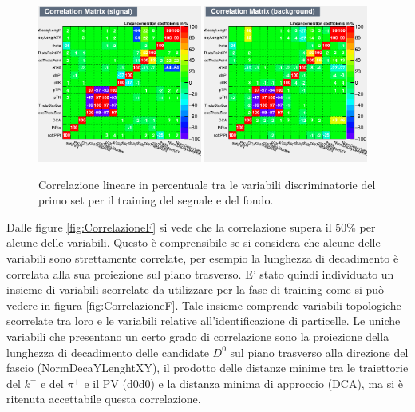    
    \begin{figure}
       \centering
       \includegraphics[width=0.48\textwidth]{training&testing/CorrelationMatrixSin.png}
        \includegraphics[width=0.48\textwidth]{training&testing/CorrelationMatrixBin.png}
       \caption{Correlazione lineare in percentuale tra le variabili discriminatorie del primo set per il training del segnale e del fondo.}
       \label{fig:correlazioneIn}
   \end{figure} 
    
 
    
    Dalle figure \ref{fig:CorrelazioneF} si vede che la correlazione supera il $50 \%$ per alcune delle variabili. Questo \`e comprensibile se si considera che alcune delle variabili sono strettamente correlate, per esempio la lunghezza di decadimento \`e correlata alla sua proiezione sul piano trasverso. E' stato quindi individuato un insieme di variabili scorrelate da utilizzare per la fase di training come si pu\`o vedere in figura \ref{fig:CorrelazioneF}. Tale insieme comprende variabili topologiche scorrelate tra loro e le variabili relative all'identificazione di particelle. Le uniche variabili che presentano un certo grado di correlazione sono la proiezione della lunghezza di decadimento delle candidate $D^0$ sul piano trasverso alla direzione del fascio (NormDecaYLenghtXY), il prodotto delle distanze minime tra le traiettorie del $k^-$ e del $\pi^+$ e il PV (d0d0) e la distanza minima di approccio (DCA), ma si è ritenuta accettabile questa correlazione. 
 
